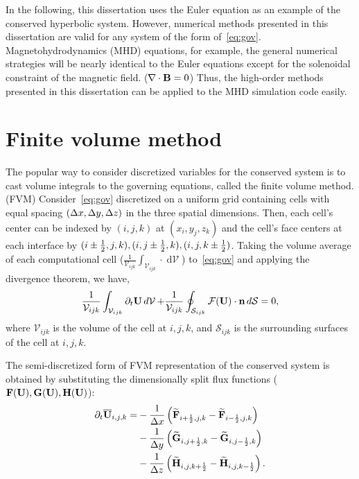 In the following, this dissertation uses the Euler equation as an example
of the conserved hyperbolic system.
However, numerical methods presented in this dissertation are valid for any system
of the form of~\cref{eq:gov}. Magnetohydrodynamics (MHD) equations, for example,
the general numerical strategies will be nearly identical to the Euler equations
except for the solenoidal constraint of the magnetic field. (\( \nabla \cdot \mathbf{B} = 0 \))
Thus, the high-order methods presented in this dissertation can be applied to the MHD simulation code easily.


\section{Finite volume method}\label{sec:fvm}

The popular way to consider discretized variables for the conserved system
is to cast volume integrals to the governing equations, called the finite volume method. (FVM)
Consider~\cref{eq:gov} discretized on a uniform grid containing cells with equal spacing \( (\Delta x, \Delta y, \Delta z) \)
in the three spatial dimensions.
Then, each cell's center can be indexed by \( (i, j, k) \) at \( (x_{i}, y_{j}, z_{k}) \)
and the cell's face centers at each interface by \( (i \pm \frac{1}{2}, j, k), (i, j \pm \frac{1}{2}, k), (i, j, k \pm \frac{1}{2}) \).
Taking the volume average of each computational cell (\( \frac{1}{\mathcal{V}_{ijk}} \int_{\mathcal{V}_{ijk}} \cdot \mathop{d \mathcal{V}}\))
to~\cref{eq:gov} and applying the divergence theorem, we have,
\begin{equation}\label{eq:fvm}
    \frac{1}{\mathcal{V}_{ijk}} \int_{\mathcal{V}_{ijk}} \partial_{t} \mathbf{U} \mathop{d \mathcal{V}}
    + \frac{1}{\mathcal{V}_{ijk}} \oint_{\mathcal{S}_{ijk}} \mathcal{F} (\mathbf{U}) \cdot \mathbf{n} \mathop{d \mathcal{S}} = 0,
\end{equation}
where \( \mathcal{V}_{ijk} \) is the volume of the cell at \( i,j,k \),
and \( \mathcal{S}_{ijk} \) is the surrounding surfaces of the cell at \( i,j,k \).

The semi-discretized form of FVM representation of the conserved system
is obtained by substituting the dimensionally split flux functions
(\( \mathbf{F} (\mathbf{U}), \mathbf{G} (\mathbf{U}), \mathbf{H} (\mathbf{U}) \)):
\begin{equation}\label{eq:fvm_discrete}
    \begin{split}
        \partial_{t} \overline{\mathbf{U}}_{i,j,k} =& - \frac{1}{\Delta x} \left( \widetilde{\mathbf{F}}_{{i+\frac{1}{2}},j,k} - \widetilde{\mathbf{F}}_{{i-\frac{1}{2}},j,k} \right) \\
                                             & - \frac{1}{\Delta y} \left( \widetilde{\mathbf{G}}_{i,{j+\frac{1}{2}},k} - \widetilde{\mathbf{G}}_{i,{j-\frac{1}{2}},k} \right) \\
                                             & - \frac{1}{\Delta z} \left( \widetilde{\mathbf{H}}_{i,j,{k+\frac{1}{2}}} - \widetilde{\mathbf{H}}_{i,j,{k-\frac{1}{2}}} \right).
    \end{split}
\end{equation}

